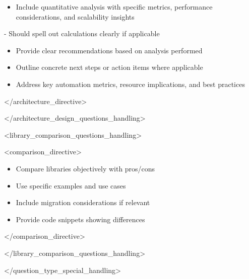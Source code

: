 \documentclass[11pt,a4paper]{article}
\begin{document}
\begin{itemize}
\item Include quantitative analysis with specific metrics, performance considerations, and scalability insights
\end{itemize}

  - Should spell out calculations clearly if applicable

\begin{itemize}
\item Provide clear recommendations based on analysis performed
\end{itemize}

\begin{itemize}
\item Outline concrete next steps or action items where applicable
\end{itemize}

\begin{itemize}
\item Address key automation metrics, resource implications, and best practices
\end{itemize}

</architecture\_directive>

</architecture\_design\_questions\_handling>

<library\_comparison\_questions\_handling>

<comparison\_directive>

\begin{itemize}
\item Compare libraries objectively with pros/cons
\end{itemize}

\begin{itemize}
\item Use specific examples and use cases
\end{itemize}

\begin{itemize}
\item Include migration considerations if relevant
\end{itemize}

\begin{itemize}
\item Provide code snippets showing differences
\end{itemize}

</comparison\_directive>

</library\_comparison\_questions\_handling>

</question\_type\_special\_handling>
\end{document}
